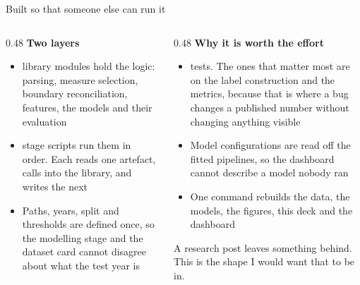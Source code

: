 \documentclass[aspectratio=169,11pt]{beamer}
\newcommand{\lead}[1]{{\color{seriesone}\bfseries #1}}
\newcommand{\smallcap}[1]{{\footnotesize\color{inktwo}#1}}
\begin{document}
\begin{frame}{Built so that someone else can run it}
  \begin{columns}[T,onlytextwidth]
    \begin{column}{0.48\textwidth}
      \lead{Two layers}
      \begin{itemize}\footnotesize
        \item \NumModules{} library modules hold the logic: parsing, measure
              selection, boundary reconciliation, features, the models and
              their evaluation
        \item \NumStages{} stage scripts run them in order. Each reads one
              artefact, calls into the library, and writes the next
        \item Paths, years, split and thresholds are defined once, so the
              modelling stage and the dataset card cannot disagree about what
              the test year is
      \end{itemize}
    \end{column}
    \begin{column}{0.48\textwidth}
      \lead{Why it is worth the effort}
      \begin{itemize}\footnotesize
        \item \NumTests{} tests. The ones that matter most are on the label
              construction and the metrics, because that is where a bug
              changes a published number without changing anything visible
        \item Model configurations are read off the fitted pipelines, so the
              dashboard cannot describe a model nobody ran
        \item One command rebuilds the data, the models, the figures, this
              deck and the dashboard
      \end{itemize}
      \vspace{1mm}

      \smallcap{A research post leaves something behind. This is the shape I
      would want that to be in.}
    \end{column}
  \end{columns}
\end{frame}
\end{document}
